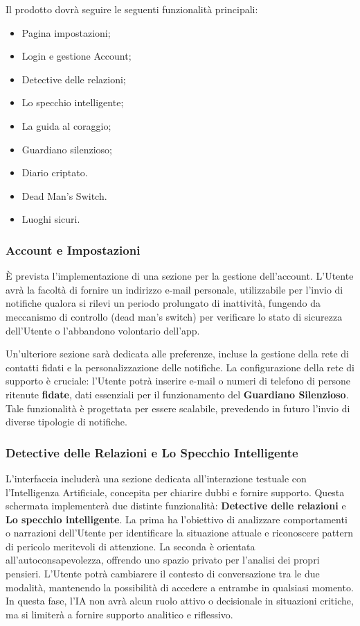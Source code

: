 \documentclass[a4paper,12pt]{article}
\begin{document}
Il prodotto dovrà seguire le seguenti funzionalità principali:

\begin{itemize}
    \item Pagina impostazioni;
    \item Login e gestione Account;
    \item Detective delle relazioni;
    \item Lo specchio intelligente;
    \item La guida al coraggio;
    \item Guardiano silenzioso;
    \item Diario criptato.
    \item Dead Man's Switch.
    \item Luoghi sicuri.
\end{itemize}

\subsubsection{Account e Impostazioni}
È prevista l'implementazione di una sezione per la gestione dell'account. L'Utente avrà la facoltà di fornire un indirizzo e-mail personale, utilizzabile per l'invio di notifiche qualora si rilevi un periodo prolungato di inattività, fungendo da meccanismo di controllo (dead man's switch) per verificare lo stato di sicurezza dell'Utente o l'abbandono volontario dell'app.

Un'ulteriore sezione sarà dedicata alle preferenze, incluse la gestione della rete di contatti fidati e la personalizzazione delle notifiche. La configurazione della rete di supporto è cruciale: l'Utente potrà inserire e-mail o numeri di telefono di persone ritenute \textbf{fidate}, dati essenziali per il funzionamento del \textbf{Guardiano Silenzioso}. Tale funzionalità è progettata per essere scalabile, prevedendo in futuro l'invio di diverse tipologie di notifiche.

\subsubsection{Detective delle Relazioni e Lo Specchio Intelligente}
L'interfaccia includerà una sezione dedicata all'interazione testuale con l'Intelligenza Artificiale, concepita per chiarire dubbi e fornire supporto. Questa schermata implementerà due distinte funzionalità: \textbf{Detective delle relazioni} e \textbf{Lo specchio intelligente}.
La prima ha l'obiettivo di analizzare comportamenti o narrazioni dell'Utente per identificare la situazione attuale e riconoscere pattern di pericolo meritevoli di attenzione. La seconda è orientata all'autoconsapevolezza, offrendo uno spazio privato per l'analisi dei propri pensieri. L'Utente potrà cambiarere il contesto di conversazione tra le due modalità, mantenendo la possibilità di accedere a entrambe in qualsiasi momento. In questa fase, l'IA non avrà alcun ruolo attivo o decisionale in situazioni critiche, ma si limiterà a fornire supporto analitico e riflessivo.
\end{document}
